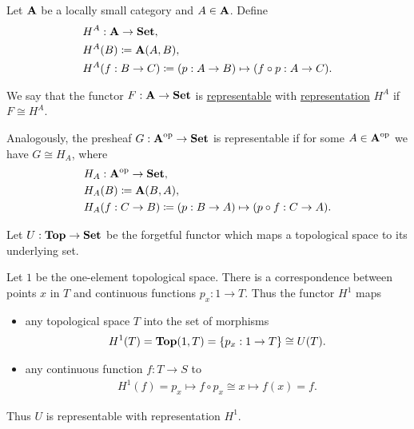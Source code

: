 \begin{definition}\label{def:representable_functor}\cite[definitions 4.1.3, 4.1.16]{Leinster2014}
  Let $\operatorname{\mathbf{A}}$ be a locally small category and $A \in \operatorname{\mathbf{A}}$. Define
  \begin{align*}
    &H^A: \operatorname{\mathbf{A}} \to \operatorname{\mathbf{Set}}, \\
    &H^A(B) \coloneqq \operatorname{\mathbf{A}}(A, B), \\
    &H^A(f: B \to C) \coloneqq (p: A \to B) \mapsto (f \circ p: A \to C).
  \end{align*}

  We say that the functor $F: \operatorname{\mathbf{A}} \to \operatorname{\mathbf{Set}}$ is \ul{representable} with \ul{representation} $H^A$ if $F \cong H^A$.

  Analogously, the presheaf $G: \operatorname{\mathbf{A}}^{\operatorname{op}} \to \operatorname{\mathbf{Set}}$ is representable if for some $A \in \operatorname{\mathbf{A}}^{\operatorname{op}}$ we have $G \cong H_A$, where
  \begin{align*}
    &H_A: \operatorname{\mathbf{A}}^{\operatorname{op}} \to \operatorname{\mathbf{Set}}, \\
    &H_A(B) \coloneqq \operatorname{\mathbf{A}}(B, A), \\
    &H_A(f: C \to B) \coloneqq (p: B \to A) \mapsto (p \circ f: C \to A).
  \end{align*}
\end{definition}

\begin{example}\label{def:top_representable_functor}\cite[example 4.1.4]{Leinster2014}
  Let $U: \operatorname{\mathbf{Top}} \to \operatorname{\mathbf{Set}}$ be the forgetful functor which maps a topological space to its underlying set.

  Let $1$ be the one-element topological space. There is a correspondence between points $x$ in $T$ and continuous functions $p_x: 1 \to T$. Thus the functor $H^1$ maps
  \begin{itemize}
    \item any topological space $T$ into the set of morphisms
    \begin{align*}
      H^1(T) = \operatorname{\mathbf{Top}}(1, T) = \{ p_x: 1 \to T \} \cong U(T).
    \end{align*}
    \item any continuous function $f: T \to S$ to
    \begin{align*}
      H^1(f) = p_x \mapsto f \circ p_x \cong x \mapsto f(x) = f.
    \end{align*}
  \end{itemize}

  Thus $U$ is representable with representation $H^1$.
\end{example}

